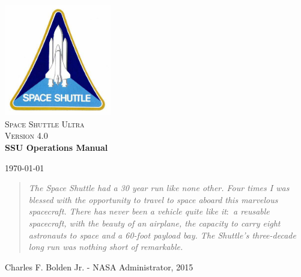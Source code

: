 \documentclass[13pt]{article}
\begin{document}
\begin{titlepage}

\begin{center}

\includegraphics[width=0.35\textwidth]{SSP.jpg}\\[1cm]

\textsc{\LARGE Space Shuttle Ultra}\\[1.5cm]

\textsc{\Large Version 4.0}\\[0.5cm]

\huge \bfseries SSU Operations Manual\\[0.4cm]

\vfill

{\large \today}

\end{center}
\end{titlepage}


\newpage
\thispagestyle{empty}
\vspace*{\fill}
\begin{quote}
\centering
\textit{The Space Shuttle had a 30 year run like none other. Four times I was blessed with the opportunity to travel to space aboard this marvelous spacecraft. There has never been a vehicle quite like it$\colon$ a reusable spacecraft, with the beauty of an airplane, the capacity to carry eight astronauts to space and a 60-foot payload bay. The Shuttle's three-decade long run was nothing short of remarkable.}
\end{quote}
\begin{flushright}
Charles F. Bolden Jr. - NASA Administrator, 2015
\end{flushright}
\vspace*{\fill}
\newpage


\end{document}
